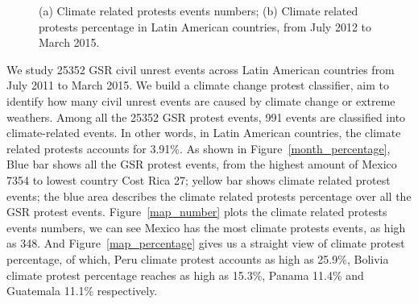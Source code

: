 \documentclass[9pt,twocolumn,twoside]{pnas-new}
\begin{document}
\begin{figure}[ht]
	\centering
	\caption{(a) Climate related protests events numbers; (b) Climate related protests percentage in Latin American countries, from July 2012 to March 2015. }
\label{map}
\end{figure}


We study 25352 GSR civil unrest events across Latin American countries from July 2011 to March 2015. We build a climate change protest classifier, aim to identify how many civil unrest events are caused by climate change or extreme weathers. Among all the 25352 GSR protest events,  991 events are classified into climate-related events. In other words, in Latin American countries, the climate related protests accounts for 3.91\%. As shown in Figure~\ref{month_percentage}, Blue bar shows all the GSR protest events, from the highest amount of Mexico 7354 to lowest country Cost Rica 27; yellow bar shows climate related protest events; the blue area describes the climate related protests percentage over all the GSR protest events. Figure~\ref{map_number} plots the climate related protests events numbers, we can see Mexico has the most climate protests events, as high as 348. And Figure~\ref{map_percentage} gives us a straight view of climate protest percentage, of which, Peru climate protest accounts as high as 25.9\%, Bolivia climate protest percentage reaches as high as 15.3\%, Panama 11.4\% and Guatemala 11.1\% respectively.
\end{document}
